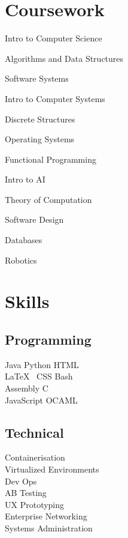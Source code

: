 \documentclass[]{deedy-resume-openfont}
\begin{document}
\begin{minipage}[t]{0.33\textwidth}

\section{Coursework}
\vspace{\topsep}
\begin{tightemize}
\item Intro to Computer Science
\item Algorithms and Data Structures
\item Software Systems
\item Intro to Computer Systems
\item Discrete Structures
\item Operating Systems
\item Functional Programming
\item Intro to AI
\item Theory of Computation
\item Software Design
\item Databases
\item Robotics
\end{tightemize}
\sectionsep


\section{Skills}
\subsection{Programming}
Java \textbullet{} Python \textbullet{} HTML\\
\LaTeX\ \textbullet{} CSS \textbullet{} Bash\\ 
Assembly \textbullet{} C\\
JavaScript \textbullet{} OCAML\\
\sectionsep
\subsection{Technical}
Containerisation\\
Virtualized Environments\\ 
Dev Ops\\
AB Testing\\
UX Prototyping\\
Enterprise Networking\\
Systems Administration\\
\sectionsep

\end{minipage}
\end{document}
